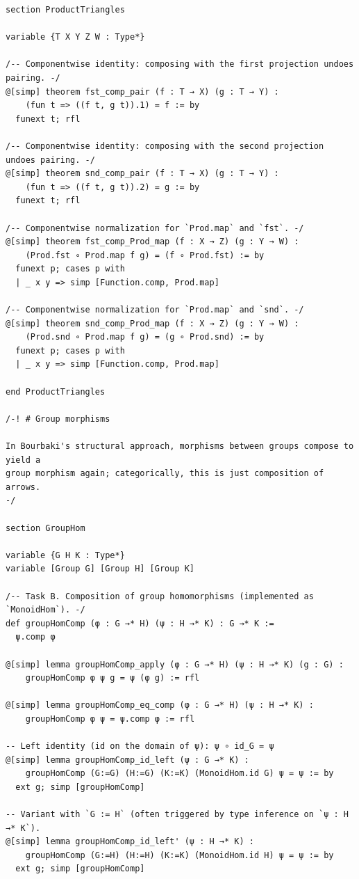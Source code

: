 \documentclass[11pt]{article}
\theoremstyle{definition}
\begin{document}
\begin{lstlisting}[language=lean]
section ProductTriangles

variable {T X Y Z W : Type*}

/-- Componentwise identity: composing with the first projection undoes pairing. -/
@[simp] theorem fst_comp_pair (f : T → X) (g : T → Y) :
    (fun t => ((f t, g t)).1) = f := by
  funext t; rfl

/-- Componentwise identity: composing with the second projection undoes pairing. -/
@[simp] theorem snd_comp_pair (f : T → X) (g : T → Y) :
    (fun t => ((f t, g t)).2) = g := by
  funext t; rfl

/-- Componentwise normalization for `Prod.map` and `fst`. -/
@[simp] theorem fst_comp_Prod_map (f : X → Z) (g : Y → W) :
    (Prod.fst ∘ Prod.map f g) = (f ∘ Prod.fst) := by
  funext p; cases p with
  | _ x y => simp [Function.comp, Prod.map]

/-- Componentwise normalization for `Prod.map` and `snd`. -/
@[simp] theorem snd_comp_Prod_map (f : X → Z) (g : Y → W) :
    (Prod.snd ∘ Prod.map f g) = (g ∘ Prod.snd) := by
  funext p; cases p with
  | _ x y => simp [Function.comp, Prod.map]

end ProductTriangles

/-! # Group morphisms

In Bourbaki's structural approach, morphisms between groups compose to yield a
group morphism again; categorically, this is just composition of arrows.
-/

section GroupHom

variable {G H K : Type*}
variable [Group G] [Group H] [Group K]

/-- Task B. Composition of group homomorphisms (implemented as `MonoidHom`). -/
def groupHomComp (φ : G →* H) (ψ : H →* K) : G →* K :=
  ψ.comp φ

@[simp] lemma groupHomComp_apply (φ : G →* H) (ψ : H →* K) (g : G) :
    groupHomComp φ ψ g = ψ (φ g) := rfl

@[simp] lemma groupHomComp_eq_comp (φ : G →* H) (ψ : H →* K) :
    groupHomComp φ ψ = ψ.comp φ := rfl

-- Left identity (id on the domain of ψ): ψ ∘ id_G = ψ
@[simp] lemma groupHomComp_id_left (ψ : G →* K) :
    groupHomComp (G:=G) (H:=G) (K:=K) (MonoidHom.id G) ψ = ψ := by
  ext g; simp [groupHomComp]

-- Variant with `G := H` (often triggered by type inference on `ψ : H →* K`).
@[simp] lemma groupHomComp_id_left' (ψ : H →* K) :
    groupHomComp (G:=H) (H:=H) (K:=K) (MonoidHom.id H) ψ = ψ := by
  ext g; simp [groupHomComp]


\end{lstlisting}
\end{document}
